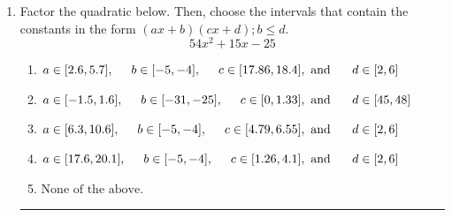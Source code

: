 \documentclass[14pt]{extbook}
\newcommand{\litem}[1]{\item#1\hspace*{-1cm}\rule{\textwidth}{0.4pt}}
\begin{document}
\begin{enumerate}
{\begin{enumerate}[label=\Alph*.]
\end{enumerate} }
\litem{
Factor the quadratic below. Then, choose the intervals that contain the constants in the form $(ax+b)(cx+d); b \leq d.$\[ 54x^{2} +15 x -25 \]\begin{enumerate}[label=\Alph*.]
\item \( a \in [2.6, 5.7], \hspace*{5mm} b \in [-5, -4], \hspace*{5mm} c \in [17.86, 18.4], \text{ and } \hspace*{5mm} d \in [2, 6] \)
\item \( a \in [-1.5, 1.6], \hspace*{5mm} b \in [-31, -25], \hspace*{5mm} c \in [0, 1.33], \text{ and } \hspace*{5mm} d \in [45, 48] \)
\item \( a \in [6.3, 10.6], \hspace*{5mm} b \in [-5, -4], \hspace*{5mm} c \in [4.79, 6.55], \text{ and } \hspace*{5mm} d \in [2, 6] \)
\item \( a \in [17.6, 20.1], \hspace*{5mm} b \in [-5, -4], \hspace*{5mm} c \in [1.26, 4.1], \text{ and } \hspace*{5mm} d \in [2, 6] \)
\item \( \text{None of the above.} \)


\end{enumerate}}
\end{enumerate}
\end{document}
